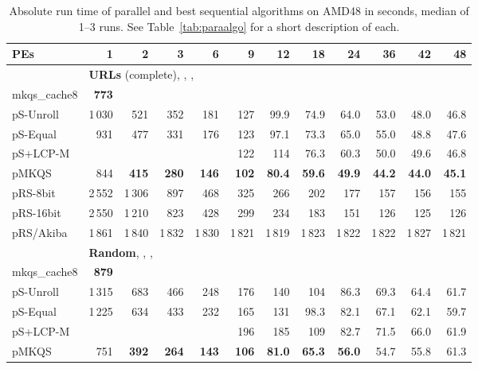 \documentclass[a4paper]{myjournal}
\begin{document}
\begin{table}\centering\small
\caption{Absolute run time of parallel and best sequential algorithms on AMD48 in seconds, median of 1--3 runs. See Table~\ref{tab:paraalgo} for a short description of each.}\label{tab:absrun-AMD48}
\def\tabcolsep{2.8pt}
\begin{tabular}{l|*{11}{r}|@{}}
PEs & 1   & 2 & 3 & 6 & 9 & 12 & 18 & 24 & 36 & 42 & 48 \\ \hline
& \multicolumn{11}{l|}{\textbf{URLs} (complete), , , } \\ \cline{2-12}
mkqs\_cache8 & \bf 773 &  &  &  &  &  &  &  &  &  &  \\
pS-Unroll & 1\,030 &     521 &     352 &     181 &     127 &     99.9 &     74.9 &     64.0 &     53.0 &     48.0 &     46.8 \\
 pS-Equal &    931 &     477 &     331 &     176 &     123 &     97.1 &     73.3 &     65.0 &     55.0 &     48.8 &     47.6 \\
 pS+LCP-M &        &         &         &         &     122 &      114 &     76.3 &     60.3 &     50.0 &     49.6 &     46.8 \\
        pMKQS &    844 & \bf 415 & \bf 280 & \bf 146 & \bf 102 & \bf 80.4 & \bf 59.6 & \bf 49.9 & \bf 44.2 & \bf 44.0 & \bf 45.1 \\
     pRS-8bit & 2\,552 &  1\,306 &     897 &     468 &     325 &      266 &      202 &      177 &      157 &      156 &      155 \\
    pRS-16bit & 2\,550 &  1\,210 &     823 &     428 &     299 &      234 &      183 &      151 &      126 &      125 &      126 \\
    pRS/Akiba & 1\,861 &  1\,840 &  1\,832 &  1\,830 &  1\,821 &   1\,819 &   1\,823 &   1\,822 &   1\,822 &   1\,827 &   1\,821 \\ \hline
& \multicolumn{11}{l|}{\textbf{Random}, , , } \\ \cline{2-12}
mkqs\_cache8 & \bf 879 &  &  &  &  &  &  &  &  &  &  \\
pS-Unroll & 1\,315 &     683 &     466 &     248 &     176 &      140 &      104 &     86.3 &     69.3 &     64.4 &     61.7 \\
 pS-Equal & 1\,225 &     634 &     433 &     232 &     165 &      131 &     98.3 &     82.1 &     67.1 &     62.1 &     59.7 \\
 pS+LCP-M &        &         &         &         &     196 &      185 &      109 &     82.7 &     71.5 &     66.0 &     61.9 \\
        pMKQS &    751 & \bf 392 & \bf 264 & \bf 143 & \bf 106 & \bf 81.0 & \bf 65.3 & \bf 56.0 &     54.7 &     55.8 &     61.3 \\

\end{tabular}
\end{table}
\end{document}
